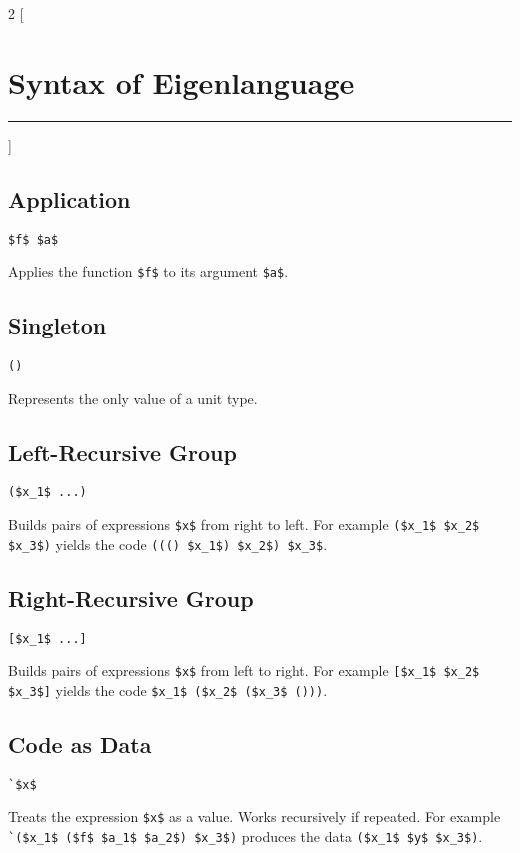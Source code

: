 \documentclass{article}
\begin{document}
\begin{multicols} 2
[\section*{\huge Syntax of Eigenlanguage}\hrule]

\bigskip\subsection*{Application}
\begin{lstlisting}
$f$ $a$
\end{lstlisting}
Applies the function \lstinline{$f$} to its argument \lstinline{$a$}.

\bigskip\subsection*{Singleton}
\begin{lstlisting}
()
\end{lstlisting}
Represents the only value of a unit type.

\bigskip\subsection*{Left-Recursive Group}
\begin{lstlisting}
($x_1$ ...)
\end{lstlisting}
Builds pairs of expressions \lstinline{$x$} from right to left.
For example \lstinline{($x_1$ $x_2$ $x_3$)}
yields the code \lstinline{((() $x_1$) $x_2$) $x_3$}.

\bigskip\subsection*{Right-Recursive Group}
\begin{lstlisting}
[$x_1$ ...]
\end{lstlisting}
Builds pairs of expressions \lstinline{$x$} from left to right.
For example \lstinline{[$x_1$ $x_2$ $x_3$]}
yields the code \lstinline{$x_1$ ($x_2$ ($x_3$ ()))}.

\bigskip\subsection*{Code as Data}
\begin{lstlisting}
`$x$
\end{lstlisting}
Treats the expression \lstinline{$x$} as a value.
Works recursively if repeated.
For example \lstinline{`($x_1$ ($f$ $a_1$ $a_2$) $x_3$)}
produces the data \lstinline{($x_1$ $y$ $x_3$)}.


\end{multicols}
\end{document}
